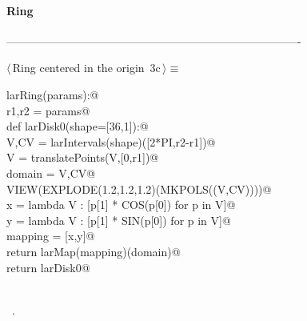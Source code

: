 \documentclass[11pt,oneside]{article}	%
\begin{document}
\paragraph{Ring}
-------------------------------------------------------------------------------
\begin{flushleft} \small \label{scrap7}
\protect{}$\langle\,$Ring centered in the origin\nobreak\ {\footnotesize 3c}$\,\rangle\equiv$
\vspace{-1ex}
\begin{list}{}{} \item
\mbox{}\verb@def larRing(params):@\\
\mbox{}\verb@   r1,r2 = params@\\
\mbox{}\verb@   def larDisk0(shape=[36,1]):@\\
\mbox{}\verb@      V,CV = larIntervals(shape)([2*PI,r2-r1])@\\
\mbox{}\verb@      V = translatePoints(V,[0,r1])@\\
\mbox{}\verb@      domain = V,CV@\\
\mbox{}\verb@      VIEW(EXPLODE(1.2,1.2,1.2)(MKPOLS((V,CV))))@\\
\mbox{}\verb@      x = lambda V : [p[1] * COS(p[0]) for p in V]@\\
\mbox{}\verb@      y = lambda V : [p[1] * SIN(p[0]) for p in V]@\\
\mbox{}\verb@      mapping = [x,y]@\\
\mbox{}\verb@      return larMap(mapping)(domain)@\\
\mbox{}\verb@   return larDisk0@\\
\mbox{}\verb@@\\
\mbox{}\verb@@{\NWsep}
\end{list}
\vspace{-1ex}
\footnotesize\addtolength{\baselineskip}{-1ex}
\begin{list}{}{\setlength{\itemsep}{-\parsep}\setlength{\itemindent}{-\leftmargin}}
\item \NWtxtMacroRefIn\ .
\end{list}
\end{flushleft}
\end{document}
